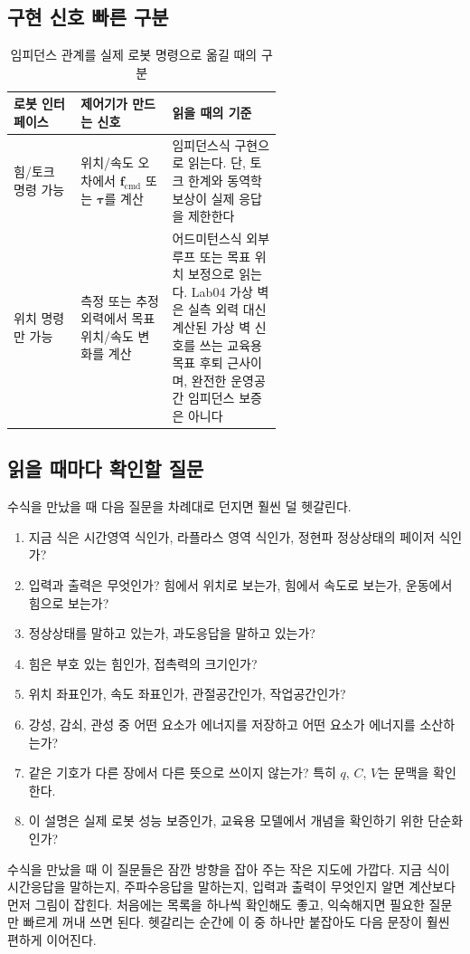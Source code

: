\subsection{구현 신호 빠른 구분}

\begin{table}[H]
  \centering
  \caption{임피던스 관계를 실제 로봇 명령으로 옮길 때의 구분}
  \small
  \setlength{\tabcolsep}{4pt}
  \begin{tabularx}{\linewidth}{@{}>{\raggedright\arraybackslash}p{0.25\linewidth}>{\raggedright\arraybackslash}p{0.34\linewidth}>{\raggedright\arraybackslash}X@{}}
    \toprule
    로봇 인터페이스 & 제어기가 만드는 신호 & 읽을 때의 기준 \\
    \midrule
    힘/토크 명령 가능 & 위치/속도 오차에서 $\bm{f}_{\mathrm{cmd}}$ 또는 $\bm{\tau}$를 계산 & 임피던스식 구현으로 읽는다. 단, 토크 한계와 동역학 보상이 실제 응답을 제한한다 \\
    위치 명령만 가능 & 측정 또는 추정 외력에서 목표 위치/속도 변화를 계산 & 어드미턴스식 외부 루프 또는 목표 위치 보정으로 읽는다. Lab04 가상 벽은 실측 외력 대신 계산된 가상 벽 신호를 쓰는 교육용 목표 후퇴 근사이며, 완전한 운영공간 임피던스 보증은 아니다 \\
    \bottomrule
  \end{tabularx}
\end{table}

\subsection{읽을 때마다 확인할 질문}

수식을 만났을 때 다음 질문을 차례대로 던지면 훨씬 덜 헷갈린다.

\begin{enumerate}
  \item 지금 식은 시간영역 식인가, 라플라스 영역 식인가, 정현파 정상상태의 페이저 식인가?
  \item 입력과 출력은 무엇인가? 힘에서 위치로 보는가, 힘에서 속도로 보는가, 운동에서 힘으로 보는가?
  \item 정상상태를 말하고 있는가, 과도응답을 말하고 있는가?
  \item 힘은 부호 있는 힘인가, 접촉력의 크기인가?
  \item 위치 좌표인가, 속도 좌표인가, 관절공간인가, 작업공간인가?
  \item 강성, 감쇠, 관성 중 어떤 요소가 에너지를 저장하고 어떤 요소가 에너지를 소산하는가?
  \item 같은 기호가 다른 장에서 다른 뜻으로 쓰이지 않는가? 특히 $q$, $C$, $V$는 문맥을 확인한다.
  \item 이 설명은 실제 로봇 성능 보증인가, 교육용 모델에서 개념을 확인하기 위한 단순화인가?
\end{enumerate}

수식을 만났을 때 이 질문들은 잠깐 방향을 잡아 주는 작은 지도에 가깝다.
지금 식이 시간응답을 말하는지, 주파수응답을 말하는지, 입력과 출력이 무엇인지 알면 계산보다 먼저 그림이 잡힌다.
처음에는 목록을 하나씩 확인해도 좋고, 익숙해지면 필요한 질문만 빠르게 꺼내 쓰면 된다.
헷갈리는 순간에 이 중 하나만 붙잡아도 다음 문장이 훨씬 편하게 이어진다.
